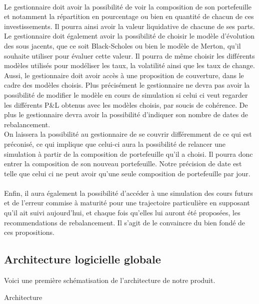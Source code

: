 \documentclass[french,12pt,a4paper]{article}
\begin{document}
\indent \\
\indent Le gestionnaire doit avoir la possibilité de voir la composition de son portefeuille et notamment la répartition en pourcentage ou bien en quantité de chacun de ces investissements. Il pourra ainsi avoir la valeur liquidative de chacune de ses parts. Le gestionnaire doit également avoir la possibilité de choisir le modèle d'évolution des sous jacents, que ce soit Black-Scholes ou bien le modèle de Merton, qu'il souhaite utiliser pour évaluer cette valeur. Il pourra de même choisir les différents modèles utilisés pour modéliser les taux, la volatilité ainsi que les taux de change. 
\indent \\
\indent Aussi, le gestionnaire doit avoir accès à une proposition de couverture, dans le cadre des modèles choisis. Plus précisément le gestionnaire ne devra pas avoir la possibilité de modifier le modèle en cours de simulation si celui ci veut regarder les différents P&L obtenus avec les modèles choisis, par soucis de cohérence. De plus le gestionnaire devra avoir la possibilité d'indiquer son nombre de dates de rebalancement.\\
On laissera la possibilité au gestionnaire de se couvrir différemment de ce qui est préconisé, ce qui implique que celui-ci aura la possibilité de relancer une simulation à partir de la composition de portefeuille qu'il a choisi. Il pourra donc entrer la composition de son nouveau portefeuille. Notre précision de date est telle que celui ci ne peut avoir qu'une seule composition de portefeuille par jour.\\
\indent \\
\indent Enfin, il aura également la possibilité d'accéder à une simulation des cours futurs et de l'erreur commise à maturité pour une trajectoire particulière en supposant qu'il ait suivi aujourd'hui, et chaque fois qu'elles lui auront été proposées, les recommendations de rebalancement. Il s'agit de le convaincre du bien fondé de ces propositions.

\subsection{Architecture logicielle globale}

Voici une première schématisation de l'architecture de notre produit.

\begin{center}
\caption{Architecture}
\end{center}
\end{document}
